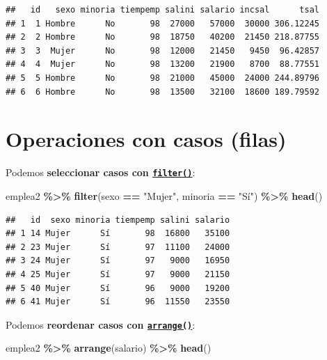 \documentclass[
]{book}
\newenvironment{Shaded}{\begin{snugshade}}{\end{snugshade}}
\newcommand{\FunctionTok}[1]{\textcolor[rgb]{0.13,0.29,0.53}{\textbf{#1}}}
\newcommand{\NormalTok}[1]{#1}
\newcommand{\SpecialCharTok}[1]{\textcolor[rgb]{0.81,0.36,0.00}{\textbf{#1}}}
\newcommand{\StringTok}[1]{\textcolor[rgb]{0.31,0.60,0.02}{#1}}
\theoremstyle{break}
\theoremstyle{nonumberplain}
\begin{document}
\begin{verbatim}
##   id   sexo minoria tiempemp salini salario incsal      tsal
## 1  1 Hombre      No       98  27000   57000  30000 306.12245
## 2  2 Hombre      No       98  18750   40200  21450 218.87755
## 3  3  Mujer      No       98  12000   21450   9450  96.42857
## 4  4  Mujer      No       98  13200   21900   8700  88.77551
## 5  5 Hombre      No       98  21000   45000  24000 244.89796
## 6  6 Hombre      No       98  13500   32100  18600 189.79592
\end{verbatim}

\section{Operaciones con casos (filas)}\label{dplyr-casos}

Podemos \textbf{seleccionar casos con \href{https://dplyr.tidyverse.org/reference/filter.html}{\texttt{filter()}}}:

\begin{Shaded}
\begin{Highlighting}[]
\NormalTok{emplea2 }\SpecialCharTok{\%\textgreater{}\%} \FunctionTok{filter}\NormalTok{(sexo }\SpecialCharTok{==} \StringTok{"Mujer"}\NormalTok{, minoria }\SpecialCharTok{==} \StringTok{"Sí"}\NormalTok{) }\SpecialCharTok{\%\textgreater{}\%} \FunctionTok{head}\NormalTok{()}
\end{Highlighting}
\end{Shaded}

\begin{verbatim}
##   id  sexo minoria tiempemp salini salario
## 1 14 Mujer      Sí       98  16800   35100
## 2 23 Mujer      Sí       97  11100   24000
## 3 24 Mujer      Sí       97   9000   16950
## 4 25 Mujer      Sí       97   9000   21150
## 5 40 Mujer      Sí       96   9000   19200
## 6 41 Mujer      Sí       96  11550   23550
\end{verbatim}

Podemos \textbf{reordenar casos con \href{https://dplyr.tidyverse.org/reference/arrange.html}{\texttt{arrange()}}}:

\begin{Shaded}
\begin{Highlighting}[]
\NormalTok{emplea2 }\SpecialCharTok{\%\textgreater{}\%} \FunctionTok{arrange}\NormalTok{(salario) }\SpecialCharTok{\%\textgreater{}\%} \FunctionTok{head}\NormalTok{()}
\end{Highlighting}
\end{Shaded}
\end{document}
